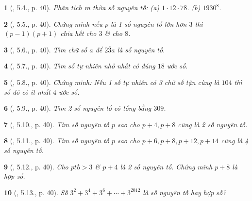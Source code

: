 \documentclass{article}
\newtheorem{baitoan}{}
\begin{document}
\begin{baitoan}[\cite{Binh_boi_duong_Toan_6_tap_1}, 5.4., p. 40]
	Phân tích ra thừa số nguyên tố: (a) $1\cdot12\cdot78$. (b) $1930^8$.
\end{baitoan}

\begin{baitoan}[\cite{Binh_boi_duong_Toan_6_tap_1}, 5.5., p. 40]
	Chứng minh nếu $p$ là 1 số nguyên tố lớn hơn $3$ thì $(p - 1)(p + 1)$ chia hết cho $3$ \& cho $8$.
\end{baitoan}

\begin{baitoan}[\cite{Binh_boi_duong_Toan_6_tap_1}, 5.6., p. 40]
	Tìm chữ số $a$ để $\overline{23a}$ là số nguyên tố.
\end{baitoan}

\begin{baitoan}[\cite{Binh_boi_duong_Toan_6_tap_1}, 5.7., p. 40]
	Tìm số tự nhiên nhỏ nhất có đúng $18$ ước số.
\end{baitoan}

\begin{baitoan}[\cite{Binh_boi_duong_Toan_6_tap_1}, 5.8., p. 40]
	Chứng minh: Nếu 1 số tự nhiên có 3 chữ số tận cùng là $104$ thì số đó có ít nhất $4$ ước số.
\end{baitoan}

\begin{baitoan}[\cite{Binh_boi_duong_Toan_6_tap_1}, 5.9., p. 40]
	Tìm 2 số nguyên tố có tổng bằng $309$.
\end{baitoan}

\begin{baitoan}[\cite{Binh_boi_duong_Toan_6_tap_1}, 5.10., p. 40]
	Tìm số nguyên tố $p$ sao cho $p + 4,p + 8$ cũng là 2 số nguyên tố.
\end{baitoan}

\begin{baitoan}[\cite{Binh_boi_duong_Toan_6_tap_1}, 5.11., p. 40]
	Tìm số nguyên tố $p$ sao cho $p + 6,p + 8,p + 12,p + 14$ cũng là 4 số nguyên tố.
\end{baitoan}

\begin{baitoan}[\cite{Binh_boi_duong_Toan_6_tap_1}, 5.12., p. 40]
	Cho $ptố > 3$ \& $p + 4$ là 2 số nguyên tố. Chứng minh $p + 8$ là hợp số.
\end{baitoan}

\begin{baitoan}[\cite{Binh_boi_duong_Toan_6_tap_1}, 5.13., p. 40]
	Số $3^2 + 3^4 + 3^6 + \cdots + 3^{2012}$ là số nguyên tố hay hợp số?
\end{baitoan}
\end{document}
